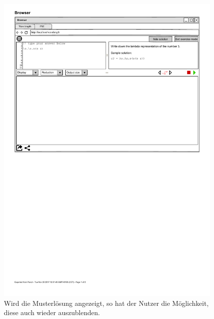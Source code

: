 \documentclass[parskip=full,11pt,twoside]{scrartcl}
\begin{document}
\begin{figure}[H]
	\centering
	\includegraphics[width=\textwidth]{img/exerciseModeSolution}
	\caption{\label{fig:showSolution}Wird die Musterlösung angezeigt, so hat der Nutzer die Möglichkeit, diese auch wieder auszublenden.}
\end{figure}
\end{document}
